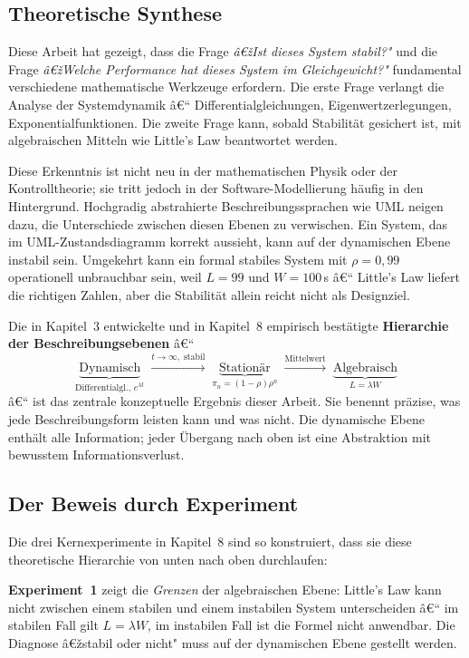 ﻿\documentclass[a4paper,12pt]{report}
\theoremstyle{definition}
\begin{document}
\subsection{Theoretische Synthese}

Diese Arbeit hat gezeigt, dass die Frage \emph{â€žIst dieses System stabil?"}
und die Frage \emph{â€žWelche Performance hat dieses System im Gleichgewicht?"}
fundamental verschiedene mathematische Werkzeuge erfordern.  Die erste Frage
verlangt die Analyse der Systemdynamik â€“ Differentialgleichungen,
Eigenwertzerlegungen, Exponentialfunktionen.  Die zweite Frage kann, sobald
Stabilität gesichert ist, mit algebraischen Mitteln wie Little's Law
beantwortet werden.

Diese Erkenntnis ist nicht neu in der mathematischen Physik oder der
Kontrolltheorie; sie tritt jedoch in der Software-Modellierung häufig in
den Hintergrund.  Hochgradig abstrahierte Beschreibungssprachen wie UML
neigen dazu, die Unterschiede zwischen diesen Ebenen zu verwischen.
Ein System, das im UML-Zustandsdiagramm korrekt aussieht, kann auf der
dynamischen Ebene instabil sein.  Umgekehrt kann ein formal stabiles System
mit $\rho = 0{,}99$ operationell unbrauchbar sein, weil $L = 99$ und
$W = 100$\,s â€“ Little's Law liefert die richtigen Zahlen, aber die Stabilität
allein reicht nicht als Designziel.

Die in Kapitel~3 entwickelte und in Kapitel~8 empirisch bestätigte
\textbf{Hierarchie der Beschreibungsebenen} â€“
\[
\underbrace{\text{Dynamisch}}_{\text{Differentialgl., } e^{\lambda t}}
\;\xrightarrow{t \to \infty,\;\text{stabil}}\;
\underbrace{\text{Stationär}}_{\pi_n = (1-\rho)\rho^n}
\;\xrightarrow{\text{Mittelwert}}\;
\underbrace{\text{Algebraisch}}_{L = \lambda W}
\]
â€“ ist das zentrale konzeptuelle Ergebnis dieser Arbeit.  Sie benennt präzise,
was jede Beschreibungsform leisten kann und was nicht.  Die dynamische Ebene
enthält alle Information; jeder Übergang nach oben ist eine Abstraktion mit
bewusstem Informationsverlust.

\subsection{Der Beweis durch Experiment}

Die drei Kernexperimente in Kapitel~8 sind so konstruiert, dass sie
diese theoretische Hierarchie von unten nach oben durchlaufen:

\textbf{Experiment~1} zeigt die \emph{Grenzen} der algebraischen Ebene:
Little's Law kann nicht zwischen einem stabilen und einem instabilen System
unterscheiden â€“ im stabilen Fall gilt $L = \lambda W$, im instabilen Fall
ist die Formel nicht anwendbar.  Die Diagnose â€žstabil oder nicht" muss auf
der dynamischen Ebene gestellt werden.
\end{document}
